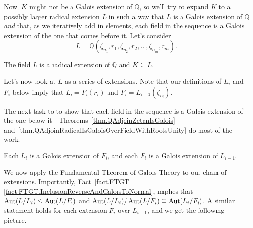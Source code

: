 Now, $K$ might not be a Galois extension of  $\mathbb{Q}$, so we'll try to  expand $K$ to a possibly larger radical extension $L$ in such a way that $L$ is a Galois extension of $\mathbb{Q}$ \emph{and} that, as we iteratively add in elements, each field in the sequence is a Galois extension of the one that comes before it. Let's consider  
\[ L = \mathbb{Q}(\zeta_{n_1},r_1,\zeta_{n_2},r_2,\ldots,\zeta_{n_m},r_m).\]

\begin{lemma}
The field $L$ is a radical extension of $\mathbb{Q}$ and $K\subseteq L$.
\end{lemma}

Let's now look at $L$ as a series of extensions. Note that our definitions of $L_i$ and $F_i$ below imply that $L_i = F_i(r_i)$ and $F_i = L_{i-1}(\zeta_{n_i})$.

\begin{center}
\end{center}

The next task to to show that each field in the sequence is a Galois extension of the one below it---Theorems~\ref{thm.QAdjoinZetanIsGalois} and~\ref{thm.QAdjoinRadicalIsGaloisOverFieldWithRootsUnity} do most of the work.

\begin{lemma}
Each  $L_i$ is a Galois extension of $F_i$, and each $F_i$ is a Galois extension of $L_{i-1}$. 
\end{lemma}

We now apply the Fundamental Theorem of Galois Theory to our chain of extensions. Importantly, Fact~\ref{fact.FTGT}\ref{fact.FTGT.InclusionReverseAndGaloisToNormal}, implies that $\operatorname{Aut}(L/L_i)\trianglelefteq \operatorname{Aut}(L/F_i)$ and  $\operatorname{Aut}(L/L_i)/\operatorname{Aut}(L/F_i)\cong \operatorname{Aut}(L_i/F_i)$. A similar statement holds for each extension $F_i$ over $L_{i-1}$, and we get the following picture.

